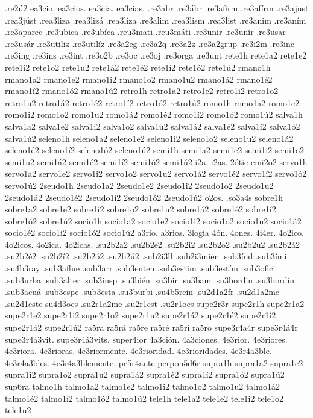{.re2ú2
ea3cio.
ea3cios.
ea3cia.
ea3cias.
.re3abr
.re3ábr
.re3afirm
.re3afírm
.re3ajust
.rea3júst
.rea3liza
.rea3lizá
.rea3líza
.re3alim
.rea3lism
.rea3list
.re3anim
.re3aním
.re3aparec
.re3ubica
.re3ubíca
.reu3mati
.reu3máti
.re3unir
.re3unír
.re3usar
.re3usár
.re3utiliz
.re3utilíz
.re3a2eg
.re3a2q
.re3a2z
.re3a2grup
.re3i2m
.re3inc
.re3ing
.re3ins
.re3int
.re3o2b
.re3oc
.re3oj
.re3orga
.re3unt
rete1h
rete1a2 rete1e2 rete1i2 rete1o2 rete1u2
rete1á2 rete1é2 rete1í2 rete1ó2 rete1ú2
rmano1h
rmano1a2 rmano1e2 rmano1i2 rmano1o2 rmano1u2
rmano1á2 rmano1é2 rmano1í2 rmano1ó2 rmano1ú2
retro1h
retro1a2 retro1e2 retro1i2 retro1o2 retro1u2
retro1á2 retro1é2 retro1í2 retro1ó2 retro1ú2
romo1h
romo1a2 romo1e2 romo1i2 romo1o2 romo1u2
romo1á2 romo1é2 romo1í2 romo1ó2 romo1ú2
salva1h
salva1a2 salva1e2 salva1i2 salva1o2 salva1u2
salva1á2 salva1é2 salva1í2 salva1ó2 salva1ú2
seleno1h
seleno1a2 seleno1e2 seleno1i2 seleno1o2 seleno1u2
seleno1á2 seleno1é2 seleno1í2 seleno1ó2 seleno1ú2
semi1h
semi1a2 semi1e2 semi1i2 semi1o2 semi1u2
semi1á2 semi1é2 semi1í2 semi1ó2 semi1ú2
i2a.
i2as.
2ótic
emi2o2
servo1h
servo1a2 servo1e2 servo1i2 servo1o2 servo1u2
servo1á2 servo1é2 servo1í2 servo1ó2 servo1ú2
2seudo1h
2seudo1a2 2seudo1e2 2seudo1i2 2seudo1o2 2seudo1u2
2seudo1á2 2seudo1é2 2seudo1í2 2seudo1ó2 2seudo1ú2
o2os.
.so3a4s
sobre1h
sobre1a2 sobre1e2 sobre1i2 sobre1o2 sobre1u2
sobre1á2 sobre1é2 sobre1í2 sobre1ó2 sobre1ú2
socio1h
socio1a2 socio1e2 socio1i2 socio1o2 socio1u2
socio1á2 socio1é2 socio1í2 socio1ó2 socio1ú2
a3rio.
a3rios.
3logía
4ón.
4ones.
4i4er.
4o2ico.
4o2icos.
4o2ica.
4o2icas.
.su2b2a2
.su2b2e2
.su2b2i2
.su2b2o2
.su2b2u2
.su2b2á2
.su2b2é2
.su2b2í2
.su2b2ó2
.su2b2ú2
.sub2i3ll
.sub2i3mien
.sub3índ
.sub3ími
.su4b3ray
.sub3aflue
.sub3arr
.sub3enten
.sub3estim
.sub3estím
.sub3ofici
.sub3urba
.sub3alter
.sub3insp
.su3bién
.su3bir
.su3bam
.su3bordin
.su3bordín
.sub3acuá
.sub3espe
.sub3esta
.su3burbi
.su4b5rein
.su2d1a2fr
.su2d1a2me
.su2d1este
su4d3oes
.su2r1a2me
.su2r1est
.su2r1oes
supe2r3r
supe2r1h
supe2r1a2 supe2r1e2 supe2r1i2 supe2r1o2 supe2r1u2
supe2r1á2 supe2r1é2 supe2r1í2 supe2r1ó2 supe2r1ú2
ra5ra
ra5rá
ra5re
ra5ré
ra5rí
ra5ro
supe3r4a4r
supe3r4á4r
supe3r4á3vit.
supe3r4á3vits.
super4ior
4a3ción.
4a3ciones.
4e3rior.
4e3riores.
4e3riora.
4e3rioras.
4e3riormente.
4e3rioridad.
4e3rioridades.
4e3r4a3ble.
4e3r4a3bles.
4e3r4a3blemente.
pe5r4ante
perpon5d6r
supra1h
supra1a2 supra1e2 supra1i2 supra1o2 supra1u2
supra1á2 supra1é2 supra1í2 supra1ó2 supra1ú2
sup6ra
talmo1h
talmo1a2 talmo1e2 talmo1i2 talmo1o2 talmo1u2
talmo1á2 talmo1é2 talmo1í2 talmo1ó2 talmo1ú2
tele1h
tele1a2 tele1e2 tele1i2 tele1o2 tele1u2
}
